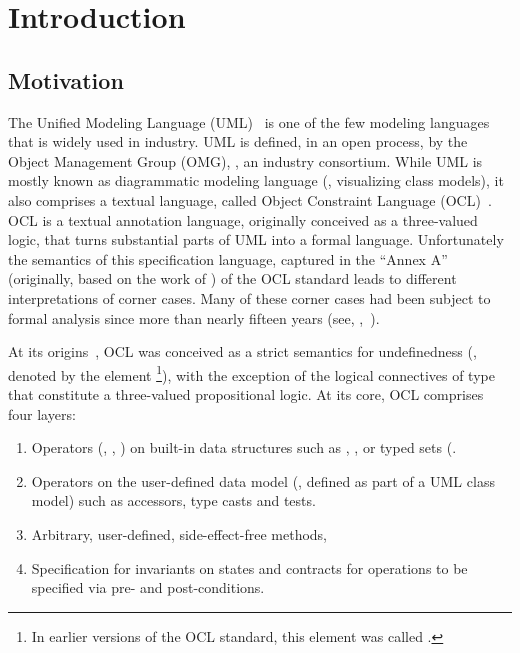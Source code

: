 \part{Introduction}
\chapter{Motivation}
The Unified Modeling Language
(UML)~\cite{omg:uml-infrastructure:2011,omg:uml-superstructure:2011}
is one of the few modeling languages that is widely used in
industry. UML is defined, in an open process, by the Object Management
Group (OMG), \ie, an industry consortium.  While UML is mostly known
as diagrammatic modeling language (\eg, visualizing class models), it
also comprises a textual language, called Object Constraint Language
(OCL)~\cite{omg:ocl:2012}. OCL is a textual annotation language,
originally conceived as a three-valued logic, that turns substantial
parts of UML into a formal language.  Unfortunately the semantics of
this specification language, captured in the ``Annex A'' (originally,
based on the work of \citet{richters:precise:2002}) of the OCL
standard leads to different interpretations of corner cases.  Many of
these corner cases had been subject to formal analysis since more than
nearly fifteen years (see,
\eg,~\cite{brucker.ea:semantic:2006-b,brucker.ea:proposal:2002,mandel.ea:ocl:1999,
  hamie.ea:reflections:1998,cook.ea::amsterdam:2002}).

At its origins~\cite{richters:precise:2002,omg:ocl:1997}, OCL was
conceived as a strict semantics for undefinedness (\eg, denoted by the
element \footnote{In earlier versions of the OCL
  standard, this element was called .}), with
the exception of the logical connectives of type 
that constitute a three-valued propositional logic. At its core, OCL
comprises four layers:
\begin{enumerate}
\item Operators (\eg, , \inlineocl{_ + _}) on
  built-in data structures such as ,
  , or typed sets (.
\item Operators on the user-defined data model (\eg, defined as part
  of a UML class model) such as accessors, type casts and tests.
\item Arbitrary, user-defined, side-effect-free methods,
\item Specification for invariants on states and contracts for
  operations to be specified via pre- and post-conditions.
\end{enumerate}

